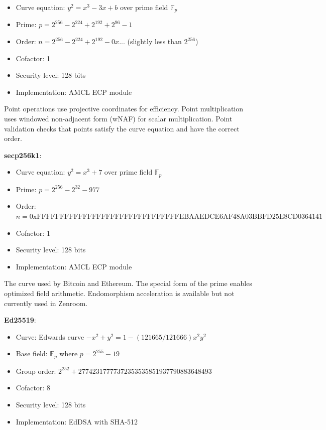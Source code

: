 \begin{itemize}
\item Curve equation: $y^2 = x^3 - 3x + b$ over prime field
  $\mathbb{F}_p$
\item Prime: $p = 2^{256} - 2^{224} + 2^{192} + 2^{96} - 1$
\item Order: $n = 2^{256} - 2^{224} + 2^{192} - 0x\text{...}$
  (slightly less than $2^{256}$)
\item Cofactor: 1
\item Security level: 128 bits
\item Implementation: AMCL ECP module
\end{itemize}

Point operations use projective coordinates for efficiency. Point
multiplication uses windowed non-adjacent form (wNAF) for scalar
multiplication. Point validation checks that points satisfy the curve
equation and have the correct order.

\textbf{secp256k1}:

\begin{itemize}
\item Curve equation: $y^2 = x^3 + 7$ over prime field $\mathbb{F}_p$
\item Prime: $p = 2^{256} - 2^{32} - 977$
\item Order: $n =
  \text{0xFFFFFFFFFFFFFFFFFFFFFFFFFFFFFFFEBAAEDCE6AF48A03BBFD25E8CD0364141}$
\item Cofactor: 1
\item Security level: 128 bits
\item Implementation: AMCL ECP module
\end{itemize}

The curve used by Bitcoin and Ethereum. The special form of the prime
enables optimized field arithmetic. Endomorphism acceleration is
available but not currently used in Zenroom.

\textbf{Ed25519}:

\begin{itemize}
\item Curve: Edwards curve $-x^2 + y^2 = 1 - (121665/121666)x^2y^2$
\item Base field: $\mathbb{F}_p$ where $p = 2^{255} - 19$
\item Group order: $2^{252} + 27742317777372353535851937790883648493$
\item Cofactor: 8
\item Security level: 128 bits
\item Implementation: EdDSA with SHA-512
\end{itemize}

